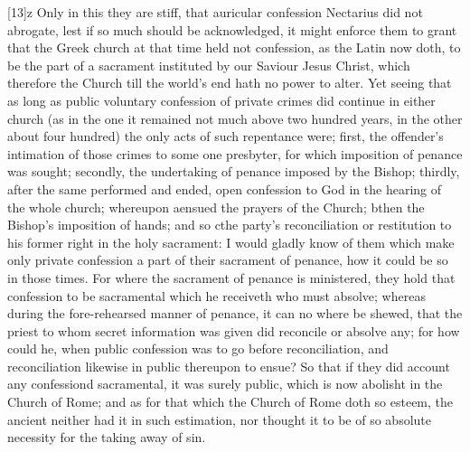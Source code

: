 [13]z Only in this they are stiff, that auricular confession Nectarius did not abrogate, lest if so much should be acknowledged, it might enforce them to grant that the Greek church at that time held not confession, as the Latin now doth, to be the part of a sacrament instituted by our Saviour Jesus Christ, which therefore the Church till the world’s end hath no power to alter. Yet seeing that as long as public voluntary confession of private crimes did continue in either church (as in the one it remained not much above two hundred years, in the other about four hundred) the only acts of such repentance were; first, the offender’s intimation of those crimes to some one presbyter, for which imposition of penance was sought; secondly, the undertaking of penance imposed by the Bishop; thirdly, after the same performed and ended, open confession to God in the hearing of the whole church; whereupon aensued the prayers of the Church; bthen the Bishop’s imposition of hands; and so cthe party’s reconciliation or restitution to his former right in the holy sacrament: I would gladly know of them which make only private confession a part of their sacrament of penance, how it could be so in those times. For where the sacrament of penance is ministered, they hold that confession to be sacramental which he receiveth who must absolve; whereas during the fore-rehearsed manner of penance, it can no where be shewed, that the priest to whom secret information was given did reconcile or absolve any; for how could he, when public confession was to go before reconciliation, and reconciliation likewise in public thereupon to  ensue? So that if they did account any confessiond sacramental, it was surely public, which is now abolisht in the Church of Rome; and as for that which the Church of Rome doth so esteem, the ancient neither had it in such estimation, nor thought it to be of so absolute necessity for the taking away of sin.

